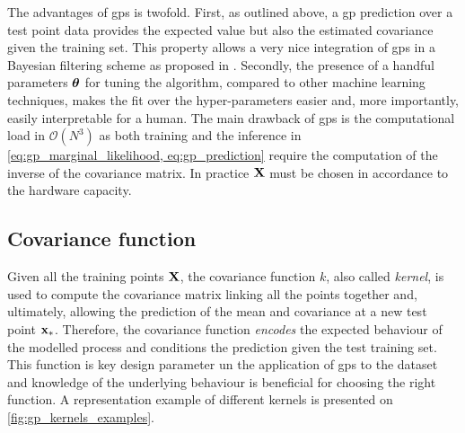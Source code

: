 The advantages of \gls{gps} is twofold. First, as outlined above, a \gls{gp} prediction over a test point data provides the expected value but also the estimated covariance given the training set. This property allows a very nice integration of \gls{gps} in a Bayesian filtering scheme as proposed in \cite{ko_gp-bayesfilters_2008}. Secondly, the presence of a handful parameters $\boldsymbol{\mathbf{\theta}}$ for tuning the algorithm, compared to other machine learning techniques, makes the fit over the hyper-parameters easier and, more importantly, easily interpretable for a human. The main drawback of \gls{gps} is the computational load in $\mathcal{O}(N^3)$ as both training and the inference in \cref{eq:gp_marginal_likelihood, eq:gp_prediction} require the computation of the inverse of the covariance matrix. In practice $\boldsymbol{\mathbf{X}}$ must be chosen in accordance to the hardware capacity.

\subsection{Covariance function}
Given all the training points $\boldsymbol{\mathbf{X}}$, the covariance function $k$, also called \emph{kernel}, is used to compute the covariance matrix linking all the points together and, ultimately, allowing the prediction of the mean and covariance at a new test point $\boldsymbol{\mathbf{x}}_\ast$. Therefore, the covariance function \emph{encodes} the expected behaviour of the modelled process and conditions the prediction given the test training set. This function is key design parameter un the application of \gls{gps} to the dataset and knowledge of the underlying behaviour is beneficial for choosing the right function. A representation example of different kernels is presented on \cref{fig:gp_kernels_examples}.

